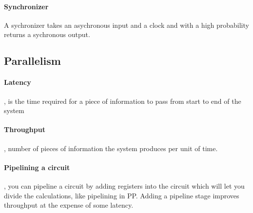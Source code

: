 	\paragraph{Synchronizer}
		A sychronizer takes an asychronous input and a clock and with a high probability returns a sychronous output.
	\subsection{Parallelism}
	\paragraph{Latency}, is the time required for a piece of information to pass from start to end of the system
	\paragraph{Throughput}, number of pieces of information the system produces per unit of time.
	\paragraph{Pipelining a circuit}, you can pipeline a circuit by adding registers into the circuit which will let you divide the calculations, like pipelining in PP. Adding a pipeline stage improves throughput at the expense of some latency.
	
	
	
	
	
	
	
	
	
	
	
	
	
	
	
	
	
	
	
	
	
	
	
	\clearpage
	
	
	